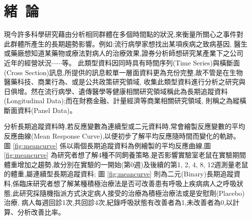 %
%

\chapter{緒~論}
現今許多科學研究藉由分析相同群體在多個時間點的狀況,來衡量所關心之事件對此群體所產生的長期趨勢影響。例如:流行病學家想找出某項疾病之致病基因,
醫生或藥廠想知道某藥物或療法對病人的治療效果,證券分析師想研究某產業下之公司近年的經營狀況$\cdots\cdots$等。
此類型資料因同時具有時間序列(Time Series)與橫斷面(Cross Section)訊息,所提供的訊息較單一層面資料更為充份完整,故不管是在生物醫藥科技、商業行為、或是公共政策研究領域,
收集此類型資料進行分析之研究與日俱增。然在流行病學、遺傳醫學等健康相關研究領域稱此為長期追蹤資料(Longitudinal Data);而在財務金融、計量經濟等商業相關研究領域,
則稱之為縱橫斷面資料(Panel Data)。

分析長期追蹤資料時,若反應變數為連續型或二元資料時,常會繪製反應變數的平均反應曲線(Mean Response Curve),以便初步了解平均反應隨時間而變化的軌跡。
圖 \ref{fig:meancurve} 係以兩個長期追蹤資料為例繪製的平均反應曲線,圖 \ref{fig:meancurve} 為研究者想了解4種不同飼養策略,是否影響實驗室老鼠在實驗期間
體重增加之趨勢,故分別在實驗的一開始(第0週)及後續的第1, 2, 4, 8, 12週測量老鼠的體重,屬連續型長期追蹤資料;
圖 \ref{fig:meancurve} 則為二元(Binary)長期追蹤資料,係臨床研究者想了解某種積極治療法是否可改善患有呼吸上疾病病人之呼吸狀態,此研究採隨機指派方式決定病人接受的治療為積極治療法或是安慰劑(Placebo)治療,
病人每週回診1次,共回診4次,紀錄呼吸狀態有改善者為1,未改善者為0,以計算、分析改善比率。

